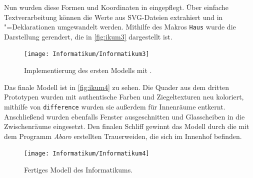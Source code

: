 Nun wurden diese Formen und Koordinaten in \Povray eingepflegt. Über einfache Textverarbeitung können die Werte aus SVG-Dateien extrahiert und in \Povray"=Deklarationen umgewandelt werden. Mithilfe des Makros \texttt{Haus} wurde die Darstellung gerendert, die in \autoref{fig:ikum3} dargestellt ist.

\begin{figure}[h]
	\centering
	\texttt{[image: Informatikum/Informatikum3]}
	\caption{Implementierung des ersten Modells mit \Povray.}
	\label{fig:ikum3}
\end{figure}

Das finale Modell ist in \autoref{fig:ikum4} zu sehen. Die Quader aus dem dritten Prototypen wurden mit authentische Farben und Ziegeltexturen neu koloriert, mithilfe von \texttt{difference} wurden sie außerdem für Innenräume entkernt. Anschließend wurden ebenfalls Fenster ausgeschnitten und Glasscheiben in die Zwischenräume eingesetzt. Den finalen Schliff gewinnt das Modell durch die mit dem Programm \textit{Abaro} erstellten Trauerweiden, die sich im Innenhof befinden.

\begin{figure}[h]
	\centering
	\texttt{[image: Informatikum/Informatikum4]}
	\caption{Fertiges Modell des Informatikums.}
	\label{fig:ikum4}
\end{figure}
